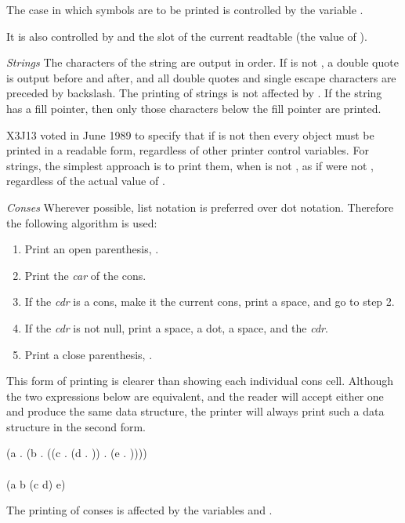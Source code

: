 \begin{flushdesc}
\begin{obsolete}
The case in which symbols are to be printed is controlled by the variable
.
\end{obsolete}
\begin{newer}
It is also controlled by  and the  slot of the current
readtable (the value of ).
\end{newer}
\begin{obsolete}
\item[{\it Strings}]
The characters of the string are output in order.
If  is not {\false}, a double quote
is output before and after, and all
double quotes and single escape characters are preceded by backslash.
The printing of strings is not affected by .
If the string has a fill pointer, then only those characters below
the fill pointer are printed.
\end{obsolete}

\begin{newer}
X3J13 voted in June 1989  to specify that if 
is not {\false} then every object must be printed in a readable form,
regardless of other printer control variables.  For strings, the simplest approach
is to print them, when  is not {\false}, as if 
were not {\false}, regardless of the actual value of .
\end{newer}

\item[{\it Conses}]
Wherever possible, list notation is preferred over dot
notation.  Therefore the following algorithm is used:
\begin{enumerate}
\item Print an open parenthesis, \cd{(}.
\item Print the {\it car} of the cons.
\item If the {\it cdr} is a cons, make it the current cons, print a space, and go to step 2.
\item If the {\it cdr} is not null, print a space, a dot, a space, and the {\it cdr}.
\item Print a close parenthesis, \cd{)}.
\end{enumerate}

This form of printing is clearer than showing each individual cons
cell.  Although the two expressions below are equivalent,
and the reader will accept
either one and produce the same data structure, the printer will
always print such a data structure in the second form.
\begin{lisp}
(a . (b . ((c . (d . {\nil})) . (e . {\nil})))) \\
\\
(a b (c d) e)
\end{lisp}
\begin{obsolete}
The printing of conses is affected by the variables 
and .
\end{obsolete}


\end{flushdesc}
